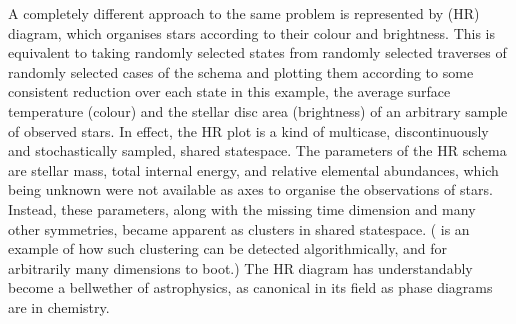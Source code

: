 \documentclass[letterpaper,10pt,english]{jupyterBook}
\begin{document}
\sphinxAtStartPar
A completely different approach to the same problem is represented by  (HR) diagram, which organises stars according to their colour and brightness. This is equivalent to taking randomly selected states from randomly selected traverses of randomly selected cases of the schema and plotting them according to some consistent reduction over each state \sphinxhyphen{} in this example, the average surface temperature (colour) and the stellar disc area (brightness) of an arbitrary sample of observed stars. In effect, the HR plot is a kind of multi\sphinxhyphen{}case, discontinuously and stochastically sampled, shared state\sphinxhyphen{}space. The parameters of the HR schema are stellar mass, total internal energy, and relative elemental abundances, which \sphinxhyphen{} being  unknown \sphinxhyphen{} were not available as axes to organise the observations of stars. Instead, these parameters, along with the missing time dimension and many other symmetries, became apparent  as clusters in shared state\sphinxhyphen{}space. ( is an example of how such clustering can be detected algorithmically, and for arbitrarily many dimensions to boot.) The HR diagram has understandably become a bellwether of astrophysics, as canonical in its field as phase diagrams are in chemistry.
\end{document}
